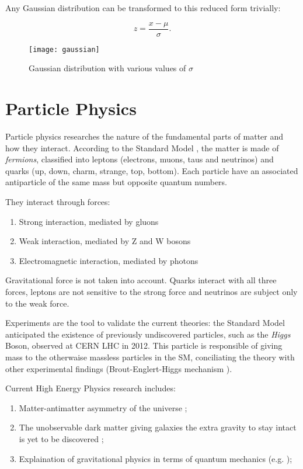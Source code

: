 Any Gaussian distribution can be transformed to this reduced form trivially:

\begin{equation}
	z = \frac{x-\mu}{\sigma}.
\end{equation}

\begin{figure}
	\centerline{
		\texttt{[image: gaussian]}}
	\caption{Gaussian distribution with various values of $\sigma$ \cite{leo2012techniques}}
\end{figure}

\section{Particle Physics}

Particle physics researches the nature of the fundamental parts of matter and how they interact. According to the Standard Model \cite{Quang:1998yw}, the matter is made of \textit{fermions}, classified into leptons (electrons, muons, taus and neutrinos) and quarks (up, down, charm, strange, top, bottom). Each particle have an associated antiparticle of the same mass but opposite quantum numbers.

They interact through forces:

\begin{enumerate}
	\item Strong interaction, mediated by gluons
	\item Weak interaction, mediated by Z and W bosons
	\item Electromagnetic interaction, mediated by photons
\end{enumerate}

Gravitational force is not taken into account. Quarks interact with all three forces, leptons are not sensitive to the strong force and neutrinos are subject only to the weak force.

Experiments are the tool to validate the current theories: the Standard Model anticipated the existence of previously undiscovered particles, such as the \textit{Higgs} Boson, observed at CERN LHC in 2012. This particle is responsible of giving mass to the otherwaise massless particles in the SM, conciliating the theory with other experimental findings (Brout-Englert-Higgs mechanism \cite{PhysRevLett.13.321} \cite{PhysRevLett.13.508}).

Current High Energy Physics research includes:
\begin{enumerate}
	\item Matter-antimatter asymmetry of the universe \cite{Bernreuther:2002uj};
	\item The unobservable dark matter giving galaxies the extra gravity to stay intact is yet to be discovered \cite{bertone2005particle};
	\item Explaination of gravitational physics in terms of quantum mechanics (e.g. \cite{Rovelli:2011eq});
\end{enumerate}

